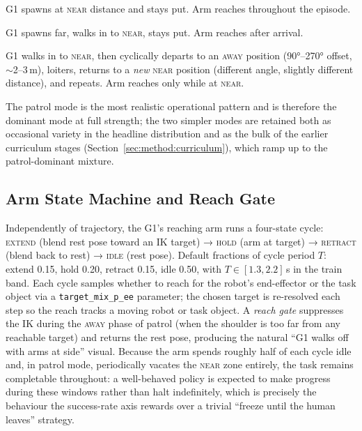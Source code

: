 \documentclass[11pt,a4paper]{report}
\begin{document}
\begin{description}[leftmargin=2em,topsep=2pt,itemsep=2pt]
\item[\textsc{stationary}] G1 spawns at \textsc{near} distance and
  stays put. Arm reaches throughout the episode.
\item[\textsc{approach-loiter-depart}] G1 spawns far, walks in to
  \textsc{near}, stays put. Arm reaches after arrival.
\item[\textsc{coworker-patrol}] G1 walks in to \textsc{near}, then
  cyclically departs to an \textsc{away} position (90°--270°
  offset, $\sim$2--3\,m), loiters, returns to a \emph{new}
  \textsc{near} position (different angle, slightly different
  distance), and repeats. Arm reaches only while at \textsc{near}.
\end{description}

The patrol mode is the most realistic operational pattern and is
therefore the dominant mode at full strength; the two simpler modes
are retained both as occasional variety in the headline distribution
and as the bulk of the earlier curriculum stages
(Section~\ref{sec:method:curriculum}), which ramp up to the
patrol-dominant mixture.

\subsection{Arm State Machine and Reach Gate}
\label{sec:bench:coworker:arm}

Independently of trajectory, the G1's reaching arm runs a four-state
cycle: \textsc{extend} (blend rest pose toward an IK target) →
\textsc{hold} (arm at target) → \textsc{retract} (blend back to
rest) → \textsc{idle} (rest pose). Default fractions of cycle
period $T$: extend 0.15, hold 0.20, retract 0.15, idle 0.50, with
$T \in [1.3, 2.2]$\,s in the train band. Each cycle samples whether
to reach for the robot's end-effector or the task object via a
\texttt{target\_mix\_p\_ee} parameter; the chosen target is
re-resolved each step so the reach tracks a moving robot or task
object. A \emph{reach gate} suppresses the IK during the
\textsc{away} phase of patrol (when the shoulder is too far from
any reachable target) and returns the rest pose, producing the
natural ``G1 walks off with arms at side'' visual. Because the arm
spends roughly half of each cycle idle and, in patrol mode, periodically
vacates the \textsc{near} zone entirely, the task remains completable
throughout: a well-behaved policy is expected to make progress during
these windows rather than halt indefinitely, which is precisely the
behaviour the success-rate axis rewards over a trivial ``freeze until
the human leaves'' strategy.
\end{document}

